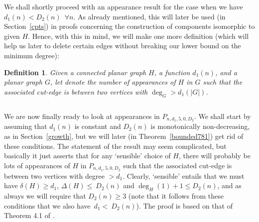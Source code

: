 \documentclass{article}
\newtheorem{Proof of Theorem}{Proof of Theorem}
\newtheorem{Definition}[Theorem]{Definition}
\begin{document}
 
We shall shortly proceed with an appearance result for the case when we have
$d_{1}(n) < D_{2}(n)$~$\forall n$.
As already mentioned, this will later be used (in Section~\ref{cpts}) 
in proofs concerning the construction of components isomorphic to given $H$.
Hence, with this in mind, we will make one more definition
(which will help us later to delete certain edges without breaking our lower bound on the minimum degree):













 

\begin{Definition}
Given a connected planar graph $H$,
a function $d_{1}(n)$,
and a planar graph $G$,
let \emph{} denote the number of appearances of $H$ in $G$ 
such that the associated cut-edge is between
two vertices with $\deg_{G} > d_{1}(|G|)$. 
\end{Definition}















\begin{displaymath}
\end{displaymath}

We are now finally ready to look at appearances in $P_{n,d_{1},5,0,D_{2}}$.
We shall start by assuming that $d_{1}(n)$ is constant and $D_{2}(n)$ is monotonically non-decreasing,
as in Section~\ref{growth},
but we will later (in Theorem~\ref{bounded781}) get rid of these conditions.
The statement of the result may seem complicated,
but basically it just asserts that for any `sensible' choice of $H$,
there will probably be lots of appearances of $H$ in $P_{n,d_{1},5,0,D_{2}}$
such that the associated cut-edge is between two vertices with degree $>d_{1}$.
Clearly, `sensible' entails that we must have $\delta(H) \geq d_{1}$,
$\Delta(H) \leq~\!D_{2}(n)$ and $\deg_{H}(1)+1 \leq D_{2}(n)$,
and as always we will require that $D_{2}(n) \geq 3$
(note that it follows from these conditions that we also have~$d_{1}<~\!D_{2}(n)$).
The proof is based on that of Theorem 4.1 of \cite{mcd}.
\end{document}
